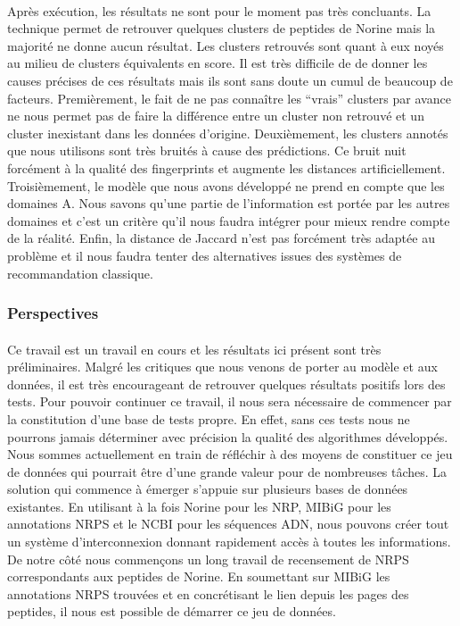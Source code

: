 \documentclass[12pt,french,twoside]{report}
\begin{document}
\paragraph{}Après exécution, les résultats ne sont pour le moment pas très concluants.
La technique permet de retrouver quelques clusters de peptides de Norine mais la majorité ne donne aucun résultat.
Les clusters retrouvés sont quant à eux noyés au milieu de clusters équivalents en score.
Il est très difficile de de donner les causes précises de ces résultats mais ils sont sans doute un cumul de beaucoup de facteurs.
Premièrement, le fait de ne pas connaître les ``vrais'' clusters par avance ne nous permet pas de faire la différence entre un cluster non retrouvé et un cluster inexistant dans les données d'origine.
Deuxièmement, les clusters annotés que nous utilisons sont très bruités à cause des prédictions.
Ce bruit nuit forcément à la qualité des fingerprints et augmente les distances artificiellement.
Troisièmement, le modèle que nous avons développé ne prend en compte que les domaines A.
Nous savons qu'une partie de l'information est portée par les autres domaines et c'est un critère qu'il nous faudra intégrer pour mieux rendre compte de la réalité.
Enfin, la distance de Jaccard n'est pas forcément très adaptée au problème et il nous faudra tenter des alternatives issues des systèmes de recommandation classique.


\subsubsection{Perspectives}

\paragraph{}Ce travail est un travail en cours et les résultats ici présent sont très préliminaires.
Malgré les critiques que nous venons de porter au modèle et aux données, il est très encourageant de retrouver quelques résultats positifs lors des tests.
Pour pouvoir continuer ce travail, il nous sera nécessaire de commencer par la constitution d'une base de tests propre.
En effet, sans ces tests nous ne pourrons jamais déterminer avec précision la qualité des algorithmes développés.
Nous sommes actuellement en train de réfléchir à des moyens de constituer ce jeu de données qui pourrait être d'une grande valeur pour de nombreuses tâches.
La solution qui commence à émerger s'appuie sur plusieurs bases de données existantes.
En utilisant à la fois Norine pour les NRP, MIBiG pour les annotations NRPS et le NCBI pour les séquences ADN, nous pouvons créer tout un système d'interconnexion donnant rapidement accès à toutes les informations.
De notre côté nous commençons un long travail de recensement de NRPS correspondants aux peptides de Norine.
En soumettant sur MIBiG les annotations NRPS trouvées et en concrétisant le lien depuis les pages des peptides, il nous est possible de démarrer ce jeu de données.




\end{document}

